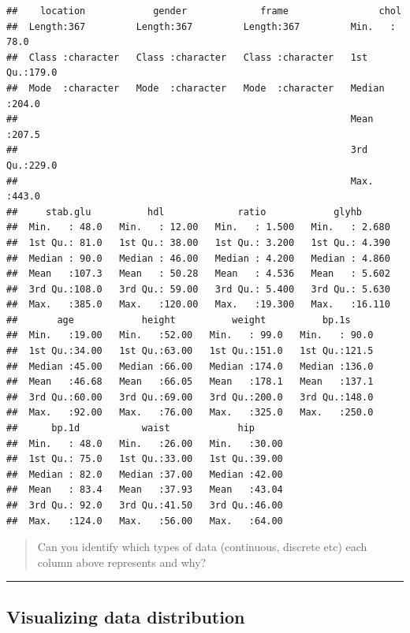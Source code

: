 \documentclass[
]{book}
\begin{document}
\begin{verbatim}
##    location            gender             frame                chol      
##  Length:367         Length:367         Length:367         Min.   : 78.0  
##  Class :character   Class :character   Class :character   1st Qu.:179.0  
##  Mode  :character   Mode  :character   Mode  :character   Median :204.0  
##                                                           Mean   :207.5  
##                                                           3rd Qu.:229.0  
##                                                           Max.   :443.0  
##     stab.glu          hdl             ratio            glyhb       
##  Min.   : 48.0   Min.   : 12.00   Min.   : 1.500   Min.   : 2.680  
##  1st Qu.: 81.0   1st Qu.: 38.00   1st Qu.: 3.200   1st Qu.: 4.390  
##  Median : 90.0   Median : 46.00   Median : 4.200   Median : 4.860  
##  Mean   :107.3   Mean   : 50.28   Mean   : 4.536   Mean   : 5.602  
##  3rd Qu.:108.0   3rd Qu.: 59.00   3rd Qu.: 5.400   3rd Qu.: 5.630  
##  Max.   :385.0   Max.   :120.00   Max.   :19.300   Max.   :16.110  
##       age            height          weight          bp.1s      
##  Min.   :19.00   Min.   :52.00   Min.   : 99.0   Min.   : 90.0  
##  1st Qu.:34.00   1st Qu.:63.00   1st Qu.:151.0   1st Qu.:121.5  
##  Median :45.00   Median :66.00   Median :174.0   Median :136.0  
##  Mean   :46.68   Mean   :66.05   Mean   :178.1   Mean   :137.1  
##  3rd Qu.:60.00   3rd Qu.:69.00   3rd Qu.:200.0   3rd Qu.:148.0  
##  Max.   :92.00   Max.   :76.00   Max.   :325.0   Max.   :250.0  
##      bp.1d           waist            hip       
##  Min.   : 48.0   Min.   :26.00   Min.   :30.00  
##  1st Qu.: 75.0   1st Qu.:33.00   1st Qu.:39.00  
##  Median : 82.0   Median :37.00   Median :42.00  
##  Mean   : 83.4   Mean   :37.93   Mean   :43.04  
##  3rd Qu.: 92.0   3rd Qu.:41.50   3rd Qu.:46.00  
##  Max.   :124.0   Max.   :56.00   Max.   :64.00
\end{verbatim}

\begin{quote}
Can you identify which types of data (continuous, discrete etc) each column above represents and why?
\end{quote}

\begin{center}\rule{0.5\linewidth}{0.5pt}\end{center}

\hypertarget{visualizing-data-distribution}{%
\subsection{Visualizing data distribution}\label{visualizing-data-distribution}}
\end{document}
